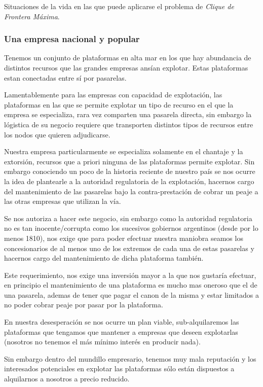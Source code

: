 Situaciones de la vida en las que puede aplicarse el problema
de \emph{Clique de Frontera M\'axima}.

\subsubsection{Una empresa nacional y popular}

Tenemos un conjunto de plataformas en alta mar en los
que hay abundancia de distintos recursos que las grandes
empresas ans\'ian explotar. Estas plataformas estan conectadas 
entre sí por pasarelas. 

Lamentablemente para las empresas con capacidad de explotaci\'on, 
las plataformas en las que se permite explotar un tipo de recurso
en el que la empresa se especializa, rara vez comparten una pasarela
directa, sin embargo la l\'ogistica de su negocio requiere que 
transporten distintos tipos de recursos entre los nodos que
quieren adjudicarse.

Nuestra empresa particularmente se especializa solamente
en el chantaje y la extorsi\'on, recursos que a priori
ninguna de las plataformas permite explotar. Sin embargo
conociendo un poco de la historia reciente de nuestro pa\'is
se nos ocurre la idea de plantearle a la autoridad regulatoria
de la explotaci\'on, hacernos cargo del mantenimiento de las 
pasarelas bajo la contra-prestaci\'on de cobrar un peaje
a las otras empresas que utilizan la v\'ia.

Se nos autoriza a hacer este negocio, sin embargo como la 
autoridad regulatoria no es tan inocente/corrupta como los
sucesivos gobiernos argentinos (desde por lo menos 1810), 
nos exige que para poder efectuar nuestra maniobra seamos 
los concesionarios de al menos uno de los extremos de cada
una de estas pasarelas y hacernos cargo del mantenimiento
de dicha plataforma tambi\'en.

Este requerimiento, nos exige una inversi\'on mayor a la
que nos gustar\'ia efectuar, en principio el mantenimiento
de una plataforma es mucho mas oneroso que el de una pasarela,
ademas de tener que pagar el canon de la misma y estar limitados
a no poder cobrar peaje por pasar por la plataforma.

En nuestra desesperaci\'on se nos ocurre un plan viable, 
sub-alquilaremos las plataformas que tengamos que mantener
a empresas que deseen explotarlas (nosotros no tenemos el 
m\'as m\'inimo inter\'es en producir nada). 

Sin embargo dentro del mundillo empresario, tenemos muy 
mala reputaci\'on y los interesados potenciales en explotar
las plataformas s\'olo est\'an dispuestos a alquilarnos a
nosotros a precio reducido. 

